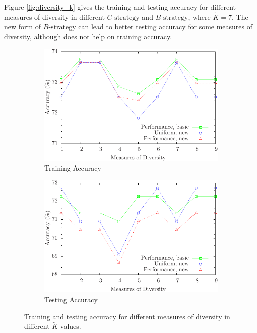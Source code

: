 Figure \ref{fig:diversity_k} gives the training and testing accuracy for different measures of diversity in different $C\text{-strategy}$ and $B\text{-strategy}$, where $\tilde{K}=7$. The new form of $B\text{-strategy}$ can lead to better testing accuracy for some measures of diversity, although does not help on training accuracy.


\begin{figure} [t]
\centering
\begin{subfigure}{.45\textwidth}
  \centering
  \includegraphics[width=.95\linewidth]{../Figure/diversity_7_others_train}
  \caption{Training Accuracy}
  \label{fig:diversity_0.7_others_train}
\end{subfigure}%
\begin{subfigure}{.45\textwidth}
  \centering
  \includegraphics[width=.95\linewidth]{../Figure/diversity_7_others_test}
  \caption{Testing Accuracy}
  \label{fig:diversity_0.7_others_test}
\end{subfigure}
\caption{Training and testing accuracy for different measures of diversity in different $\tilde{K}$ values.}
\label{fig:threshoulds}
\end{figure}


